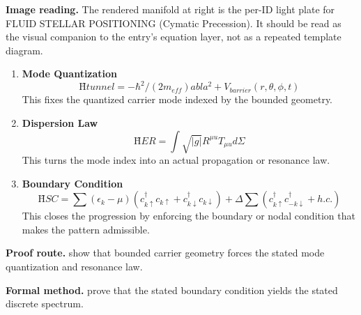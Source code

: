 \begin{samepage}
\noindent\begin{minipage}[t]{0.45\linewidth}
\vspace{0pt}
\raggedright
\scriptsize\textbf{Image reading.} The rendered manifold at right is the per-ID light plate for FLUID STELLAR POSITIONING (Cymatic Precession). It should be read as the visual companion to the entry's equation layer, not as a repeated template diagram.\par
\end{minipage}\hfill
\begin{minipage}[t]{0.53\linewidth}
\vspace*{-0.10in}
\raggedright
{}
\end{minipage}
\end{samepage}

\clearpage


\begin{enumerate}[leftmargin=1.6em,itemsep=9pt,topsep=6pt]
\item \textbf{Mode Quantization}
\[
Ĥtunnel = -\hbar^2/(2 m_{eff})  abla^2 + V_{barrier}(r, \theta, \phi, t)
\]
This fixes the quantized carrier mode indexed by the bounded geometry.

\item \textbf{Dispersion Law}
\[
ĤER = \int \sqrt{|g|} R^{\mu u} T_{\mu u} d\Sigma
\]
This turns the mode index into an actual propagation or resonance law.

\item \textbf{Boundary Condition}
\[
ĤSC = \sum (\epsilon_k - \mu)(c^\dagger_{k\uparrow} c_{k\uparrow} + c^\dagger_{k\downarrow} c_{k\downarrow}) + \Delta \sum (c^\dagger_{k\uparrow} c^\dagger_{-k\downarrow} + h.c.)
\]
This closes the progression by enforcing the boundary or nodal condition that makes the pattern admissible.
\end{enumerate}

\textbf{Proof route.} show that bounded carrier geometry forces the stated mode quantization and resonance law.

\textbf{Formal method.} prove that the stated boundary condition yields the stated discrete spectrum.

\medskip
{}


